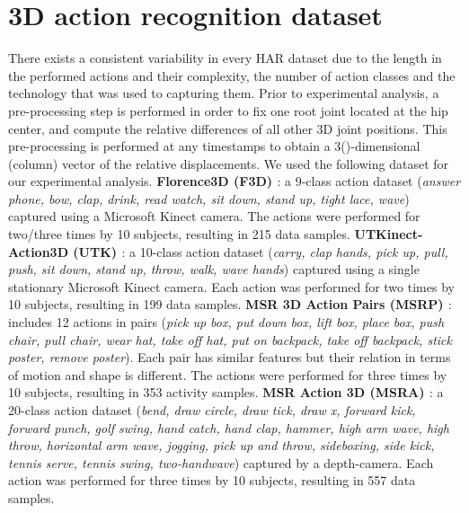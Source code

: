 \documentclass[10pt,a4paper,conference]{IEEEtran}
\begin{document}
\section{3D action recognition dataset}\label{sec:datasets}
There exists a consistent variability in every HAR dataset due to the length in the performed actions and their complexity, the number of action classes and the technology that was used to capturing them. Prior to experimental analysis, a pre-processing step is performed \cite{Camps:ACCV14, Camps:CVPR16, Vemulapalli:CVPR14, Vemulapalli:CVPR16, ECCV16, Cavazza:ICPR16, Liu:ECCV16} in order to fix one root joint located at the hip center, and compute the relative differences of all other  3D joint positions. This pre-processing is performed at any timestamps  to obtain a 3()-dimensional (column) vector  of the relative displacements. We used the following dataset for our experimental analysis. 
\newline
\textbf{Florence3D (F3D) \cite{seidenari2013recognizing}}: a 9-class action dataset (\emph{answer phone, bow, clap, drink, read watch, sit down, stand up, tight lace, wave}) captured using a Microsoft Kinect camera. The actions were performed for two/three times by 10 subjects, resulting in 215 data samples.
\newline
\textbf{UTKinect-Action3D (UTK) \cite{xia2012view}}: a 10-class action dataset (\emph{carry, clap hands, pick up, pull, push, sit down, stand up, throw, walk, wave hands}) captured using a single stationary Microsoft Kinect camera. Each action was performed for two times by 10 subjects, resulting in 199 data samples.
\newline
\textbf{MSR 3D Action Pairs (MSRP) \cite{oreifej2013hon4d}}: includes 12 actions in pairs (\emph{pick up box, put down box, lift box, place box, push chair, pull chair, wear hat, take off hat, put on backpack, take off backpack, stick poster, remove poster}). Each pair has similar features but their relation in terms of motion and shape is different. The actions were performed for three times by 10 subjects, resulting in 353 activity samples.
\newline
\textbf{MSR Action 3D (MSRA) \cite{li2010action}}: a 20-class action dataset (\emph{bend, draw circle, draw tick, draw x, forward kick, forward punch, golf swing, hand catch, hand clap, hammer, high arm wave, high throw, horizontal arm wave, jogging, pick up and throw, sideboxing, side kick, tennis serve, tennis swing, two-handwave}) captured by a depth-camera. Each action was performed for three times by 10 subjects, resulting in 557 data samples.
\end{document}
